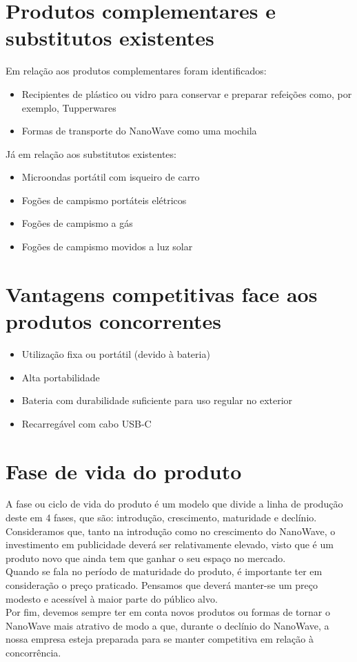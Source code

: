 \documentclass[a4paper]{article}
\begin{document}
\section{Produtos complementares e substitutos existentes}
Em relação aos produtos complementares foram identificados:
\begin{itemize}
    \item Recipientes de plástico ou vidro para conservar e preparar refeições como, por exemplo, Tupperwares
    \item Formas de transporte do NanoWave como uma mochila
\end{itemize}
Já em relação aos substitutos existentes:
\begin{itemize}
    \item Microondas portátil com isqueiro de carro
    \item Fogões de campismo portáteis elétricos
    \item Fogões de campismo a gás
    \item Fogões de campismo movidos a luz solar
\end{itemize}
\section{Vantagens competitivas face aos produtos concorrentes}
\begin{itemize}
    \item Utilização fixa ou portátil (devido à bateria)
    \item Alta portabilidade
    \item Bateria com durabilidade suficiente para uso regular no exterior
    \item Recarregável com cabo USB-C
\end{itemize}

\section{Fase de vida do produto}
A fase ou ciclo de vida do produto é um modelo que divide a linha de produção deste em 4 fases, que são: introdução, crescimento, maturidade e declínio.\\
Consideramos que, tanto na introdução como no crescimento do NanoWave, o investimento em publicidade deverá ser relativamente elevado, visto que é um produto novo que ainda tem que ganhar o seu espaço no mercado.\\
Quando se fala no período de maturidade do produto, é importante ter em consideração o preço praticado. Pensamos que deverá manter-se um preço modesto e acessível à maior parte do público alvo.\\
Por fim, devemos sempre ter em conta novos produtos ou formas de tornar o NanoWave mais atrativo de modo a que, durante o declínio do NanoWave, a nossa empresa esteja preparada para se manter competitiva em relação à concorrência.
\end{document}
